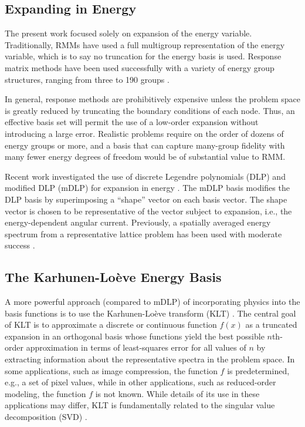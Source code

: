 \documentclass[5p,times,twocolumn,10pt]{elsarticle}
\begin{document}
\subsection{Expanding in Energy}

The present work focused solely on expansion of the energy variable.  
Traditionally, RMMs have used a full multigroup 
representation of the energy variable, which is to say no truncation for 
the energy basis is used.  Response matrix methods have been used 
successfully with a variety of energy group structures, ranging from three to 
190 groups \cite{ishii2009tdd, forget2006tdh, forget2004hcm}. 

In general, response methods are prohibitively expensive unless the problem space is 
greatly reduced by truncating the boundary conditions of each node.  Thus, an 
effective basis set will permit the use of a low-order expansion without 
introducing a large error.  Realistic problems require on the order of dozens 
of energy groups 
or more, and a basis that can capture many-group fidelity with 
many fewer energy degrees of freedom would be of substantial 
value to RMM.  

Recent work investigated the use of discrete Legendre polynomials (DLP) and  
modified DLP (mDLP) for expansion in energy \cite{Roberts2014}.  The mDLP basis 
modifies the DLP basis by superimposing a ``shape'' vector on each basis vector. 
 The shape vector is chosen to be representative of the vector subject to 
expansion, i.e., the energy-dependent angular current.  Previously, a spatially 
averaged energy spectrum from a representative lattice problem has been used 
with moderate success \cite{Roberts2014}.

\subsection{The  Karhunen-Lo\`{e}ve Energy Basis}

A more powerful approach (compared to mDLP) of incorporating physics into the 
basis functions is to use the Karhunen-Lo\`{e}ve transform (KLT)
\cite{Dony2001}.  The central goal of KLT is to approximate a discrete or 
continuous function $f(x)$ as a truncated expansion in an orthogonal basis whose 
functions yield the best possible $n$th-order approximation in terms of 
least-squares error for all values of $n$ by extracting information about the 
representative spectra in the problem space.  In some applications, such as 
image compression, the function $f$ is predetermined, e.g., a set of pixel 
values, while in other applications, such as reduced-order modeling, the 
function $f$ is not known.  While details of its use in these applications may 
differ, KLT is fundamentally related to the singular value decomposition (SVD) 
\cite{reedThesis}.
\end{document}
